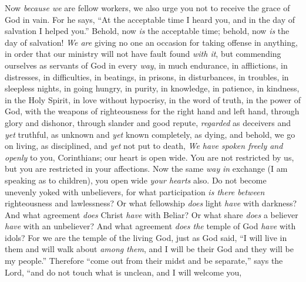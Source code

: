 \begin{biblechapter} %
 Now \textit{because we} are fellow workers, we also urge you not to receive the grace of God in vain.
\verse For he says, “At the acceptable time I heard you, 
and in the day of salvation I helped you.”
\verse Behold, now \textit{is} the acceptable time; behold, now \textit{is} the day of salvation!
\verse \textit{We are} giving no one an occasion for taking offense in anything, in order that our ministry will not have fault found \textit{with it},
\verse but commending ourselves as servants of God in every \textit{way}, in much endurance, in afflictions, in distresses, in difficulties,
\verse in beatings, in prisons, in disturbances, in troubles, in sleepless nights, in going hungry,
\verse in purity, in knowledge, in patience, in kindness, in the Holy Spirit, in love without hypocrisy,
\verse in the word of truth, in the power of God, with the weapons of righteousness for the right hand and left hand,
\verse through glory and dishonor, through slander and good repute, \textit{regarded} as deceivers and \textit{yet} truthful,
\verse as unknown and \textit{yet} known completely, as dying, and behold, we go on living, as disciplined, and \textit{yet} not put to death,
\verse \textit{We have spoken freely and openly} to you, Corinthians; our heart is open wide.
\verse You are not restricted by us, but you are restricted in your affections.
\verse Now the same \textit{way} \textit{in} exchange (I am speaking as to children), you open wide \textit{your hearts} also.
 Do not become unevenly yoked with unbelievers, for what participation \textit{is there between} righteousness and lawlessness? Or what fellowship \textit{does} light \textit{have} with darkness?
\verse And what agreement \textit{does} Christ \textit{have} with Beliar? Or what share \textit{does} a believer \textit{have} with an unbeliever?
\verse And what agreement \textit{does the} temple of God \textit{have} with idols? For we are the temple of the living God, just as God said,
\verse “I will live in them and will walk about \textit{among them}, 
and I will be their God and they will be my people.”
\verse Therefore “come out from their midst 
and be separate,” says the Lord, 
“and do not touch what is unclean, 
and I will welcome you,
\end{biblechapter}

